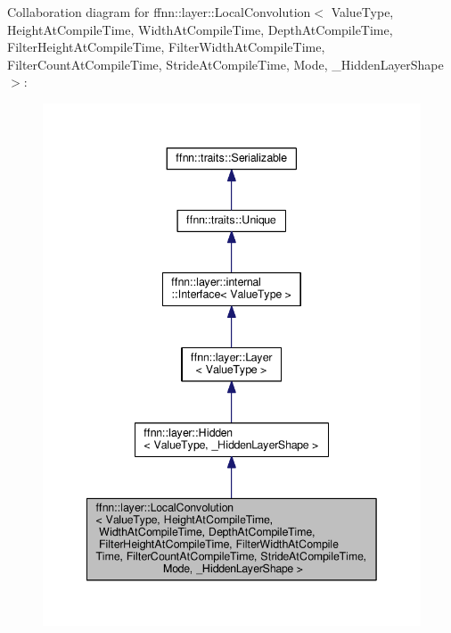 Collaboration diagram for ffnn\-:\-:layer\-:\-:Local\-Convolution$<$ Value\-Type, Height\-At\-Compile\-Time, Width\-At\-Compile\-Time, Depth\-At\-Compile\-Time, Filter\-Height\-At\-Compile\-Time, Filter\-Width\-At\-Compile\-Time, Filter\-Count\-At\-Compile\-Time, Stride\-At\-Compile\-Time, Mode, \-\_\-\-Hidden\-Layer\-Shape $>$\-:
\nopagebreak
\begin{figure}[H]
\begin{center}
\leavevmode
\includegraphics[width=342pt]{classffnn_1_1layer_1_1_local_convolution__coll__graph}
\end{center}
\end{figure}
